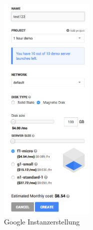 \begin{figure}[!htbp]
  \centering
\includegraphics[width=0.4\textwidth]{./03_Analyse/03_Bitnami/images/google_instancereation}
\caption{Google Instanzerstellung}
\end{figure}


